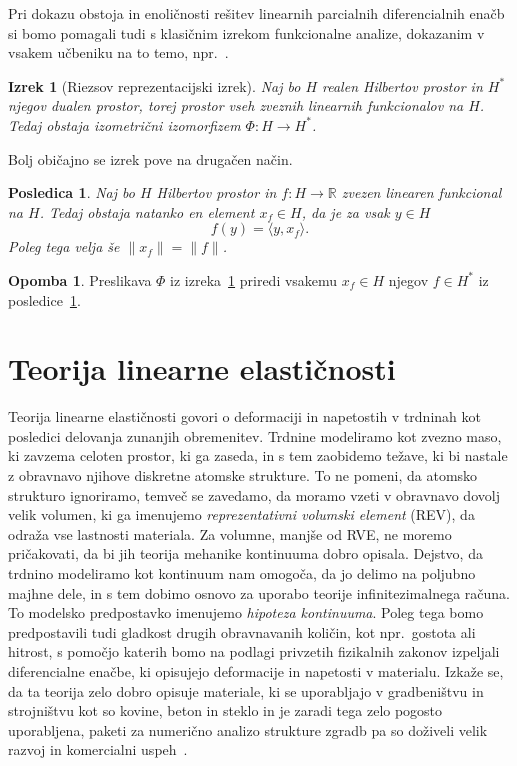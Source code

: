 \documentclass[12pt,a4paper,twoside]{article}
\theoremstyle{definition} %
\newtheorem{opomba}[definicija]{Opomba}
\theoremstyle{plain} %
\newtheorem{izrek}[definicija]{Izrek}
\newtheorem{posledica}[definicija]{Posledica}
\numberwithin{equation}{section}
\newcommand{\R}{\mathbb R}
\begin{document}
Pri dokazu obstoja in enoličnosti rešitev linearnih parcialnih diferencialnih enačb si bomo
pomagali tudi s klasičnim izrekom funkcionalne analize, dokazanim v vsakem učbeniku na to temo,
npr.~\cite[str.\ 188, izrek 3.8-1]{kreyszig1989introductory}.
\begin{izrek}[Riezsov reprezentacijski izrek]
  \label{izr:riesz-general}
  Naj bo $H$ realen Hilbertov prostor in $H^\ast$ njegov dualen prostor, torej
  prostor vseh zveznih linearnih funkcionalov na $H$. Tedaj obstaja izometrični
  izomorfizem $\Phi\colon H\to H^\ast$.
\end{izrek}
Bolj običajno se izrek pove na drugačen način.
\begin{posledica}
  \label{izr:riesz-useful}
  Naj bo $H$ Hilbertov prostor in $f\colon H\to\R$ zvezen linearen funkcional na $H$.
  Tedaj obstaja natanko en element $x_f \in H$, da je za vsak $y \in H$
  \begin{equation}
    f(y) = \langle y, x_f \rangle.
  \end{equation}
  Poleg tega velja še $\|x_f\| = \|f\|$.
\end{posledica}
\begin{opomba}
  Preslikava $\Phi$ iz izreka~\ref{izr:riesz-general} priredi vsakemu $x_f \in
  H$ njegov $f \in H^\ast$ iz posledice~\ref{izr:riesz-useful}.
\end{opomba}

\section{Teorija linearne elastičnosti}
\label{sec:mehanika}
Teorija linearne elastičnosti govori o deformaciji in napetostih v trdninah kot posledici delovanja
zunanjih obremenitev. Trdnine modeliramo kot zvezno maso, ki zavzema celoten prostor, ki ga zaseda,
in s tem zaobidemo težave, ki bi nastale z obravnavo njihove diskretne atomske strukture.  To ne
pomeni, da atomsko strukturo ignoriramo, temveč se zavedamo, da moramo vzeti v obravnavo dovolj
velik volumen, ki ga imenujemo \emph{reprezentativni volumski element} (REV), da odraža vse
lastnosti materiala. Za volumne, manjše od RVE, ne moremo pričakovati, da bi jih teorija mehanike
kontinuuma dobro opisala. Dejstvo, da trdnino modeliramo kot kontinuum nam omogoča, da jo delimo na
poljubno majhne dele, in s tem dobimo osnovo za uporabo teorije infinitezimalnega računa.  To
modelsko predpostavko imenujemo \emph{hipoteza kontinuuma}. Poleg tega bomo predpostavili tudi
gladkost drugih obravnavanih količin, kot npr.~gostota ali hitrost, s pomočjo katerih bomo na
podlagi privzetih fizikalnih zakonov izpeljali diferencialne enačbe, ki opisujejo deformacije in
napetosti v materialu.  Izkaže se, da ta teorija zelo dobro opisuje materiale, ki se uporabljajo v
gradbeništvu in strojništvu kot so kovine, beton in steklo in je zaradi tega zelo pogosto
uporabljena, paketi za numerično analizo strukture zgradb pa so doživeli velik razvoj in komercialni
uspeh~\cite{solidworks,hibbitt2001abaqus,autodesk}.
\end{document}
